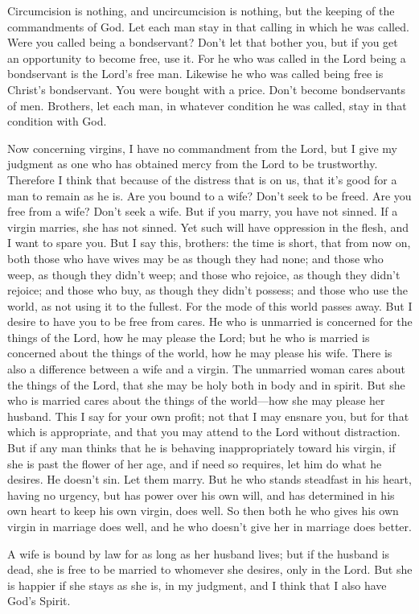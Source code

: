 {Circumcision is nothing, and uncircumcision is nothing, but the keeping of the commandments of God.
Let each man stay in that calling in which he was called.
Were you called being a bondservant? Don’t let that bother you, but if you get an opportunity to become free, use it.
For he who was called in the Lord being a bondservant is the Lord’s free man. Likewise he who was called being free is Christ’s bondservant.
You were bought with a price. Don’t become bondservants of men.
Brothers, let each man, in whatever condition he was called, stay in that condition with God.
\par }{\PP {}Now concerning virgins, I have no commandment from the Lord, but I give my judgment as one who has obtained mercy from the Lord to be trustworthy.
Therefore I think that because of the distress that is on us, that it’s good for a man to remain as he is.
Are you bound to a wife? Don’t seek to be freed. Are you free from a wife? Don’t seek a wife.
But if you marry, you have not sinned. If a virgin marries, she has not sinned. Yet such will have oppression in the flesh, and I want to spare you.
But I say this, brothers: the time is short, that from now on, both those who have wives may be as though they had none;
and those who weep, as though they didn’t weep; and those who rejoice, as though they didn’t rejoice; and those who buy, as though they didn’t possess;
and those who use the world, as not using it to the fullest. For the mode of this world passes away.
But I desire to have you to be free from cares. He who is unmarried is concerned for the things of the Lord, how he may please the Lord;
but he who is married is concerned about the things of the world, how he may please his wife.
There is also a difference between a wife and a virgin. The unmarried woman cares about the things of the Lord, that she may be holy both in body and in spirit. But she who is married cares about the things of the world—how she may please her husband.
This I say for your own profit; not that I may ensnare you, but for that which is appropriate, and that you may attend to the Lord without distraction.
But if any man thinks that he is behaving inappropriately toward his virgin, if she is past the flower of her age, and if need so requires, let him do what he desires. He doesn’t sin. Let them marry.
But he who stands steadfast in his heart, having no urgency, but has power over his own will, and has determined in his own heart to keep his own virgin, does well.
So then both he who gives his own virgin in marriage does well, and he who doesn’t give her in marriage does better.
\par }{\PP {}A wife is bound by law for as long as her husband lives; but if the husband is dead, she is free to be married to whomever she desires, only in the Lord.
But she is happier if she stays as she is, in my judgment, and I think that I also have God’s Spirit.

}
